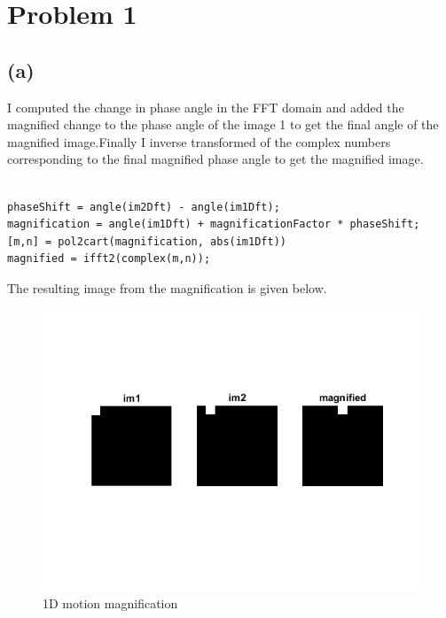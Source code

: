 \documentclass[12pt,letterpaper]{article}
\begin{document}
	
	\section*{Problem 1}
	
	\subsection*{(a)}
	I computed the change in phase angle in the FFT domain  and added the magnified change to the phase angle of the image 1 to get the final angle of the magnified image.Finally I inverse transformed of the complex numbers corresponding to the final magnified phase angle to get the magnified image.
	
	\begin{lstlisting}
	
phaseShift = angle(im2Dft) - angle(im1Dft);
magnification = angle(im1Dft) + magnificationFactor * phaseShift;
[m,n] = pol2cart(magnification, abs(im1Dft))
magnified = ifft2(complex(m,n));

	\end{lstlisting}
    The resulting image from the magnification is given below.
	\begin{figure}[htbp]
		\includegraphics{parta.png}
		\caption{1D motion magnification}
	\end{figure}
	
\end{document}
